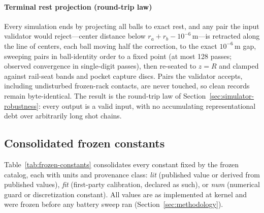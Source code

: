 \paragraph{Terminal rest projection (round-trip law)} Every
simulation ends by projecting all balls to exact rest, and any pair
the input validator would reject---center distance below
$r_a + r_b - 10^{-6}$\,m---is retracted along the line of centers,
each ball moving half the correction, to the exact $10^{-6}$\,m gap,
sweeping pairs in ball-identity order to a fixed point (at most 128
passes; observed convergence in single-digit passes), then re-seated
to $z = R$ and clamped against rail-seat bands and pocket capture
discs. Pairs the validator accepts, including undisturbed frozen-rack
contacts, are never touched, so clean records remain byte-identical.
The result is the round-trip law of
Section~\ref{sec:simulator-robustness}: every  output
is a valid  input, with no accumulating
representational debt over arbitrarily long shot chains.

\subsection{Consolidated frozen constants}
\label{sec:appendix-eq-constants}

Table~\ref{tab:frozen-constants} consolidates every constant fixed by
the frozen catalog, each with units and provenance class:
\emph{lit} (published value or derived from published values),
\emph{fit} (first-party calibration, declared as such), or
\emph{num} (numerical guard or discretization constant). All values
are as implemented at kernel  and were frozen
before any battery sweep ran (Section~\ref{sec:methodology}).

